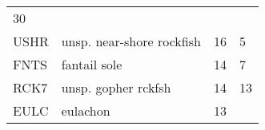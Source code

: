 \documentclass[]{article}
\begin{document}
\begin{longtable}[c]{@{}llll@{}}
\begin{minipage}[t]{0.23\columnwidth}
30
\end{minipage}
\\\addlinespace
\begin{minipage}[t]{0.08\columnwidth}\raggedright
USHR
\end{minipage} & \begin{minipage}[t]{0.36\columnwidth}\raggedright
unsp. near-shore rockfish
\end{minipage} & \begin{minipage}[t]{0.21\columnwidth}\raggedright
16
\end{minipage} & \begin{minipage}[t]{0.23\columnwidth}\raggedright
5
\end{minipage}
\\\addlinespace
\begin{minipage}[t]{0.08\columnwidth}\raggedright
FNTS
\end{minipage} & \begin{minipage}[t]{0.36\columnwidth}\raggedright
fantail sole
\end{minipage} & \begin{minipage}[t]{0.21\columnwidth}\raggedright
14
\end{minipage} & \begin{minipage}[t]{0.23\columnwidth}\raggedright
7
\end{minipage}
\\\addlinespace
\begin{minipage}[t]{0.08\columnwidth}\raggedright
RCK7
\end{minipage} & \begin{minipage}[t]{0.36\columnwidth}\raggedright
unsp. gopher rckfsh
\end{minipage} & \begin{minipage}[t]{0.21\columnwidth}\raggedright
14
\end{minipage} & \begin{minipage}[t]{0.23\columnwidth}\raggedright
13
\end{minipage}
\\\addlinespace
\begin{minipage}[t]{0.08\columnwidth}\raggedright
EULC
\end{minipage} & \begin{minipage}[t]{0.36\columnwidth}\raggedright
eulachon
\end{minipage} & \begin{minipage}[t]{0.21\columnwidth}\raggedright
13
\end{minipage} & \begin{minipage}[t]{0.23\columnwidth}\raggedright

\end{minipage}
\end{longtable}
\end{document}
